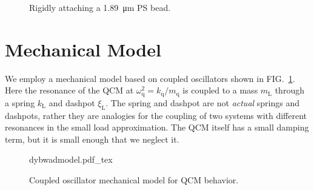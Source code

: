 \documentclass[floatfix,superscriptaddress,a4paper,notitlepage]{revtex4-1}
\newcommand{\Figure}[1]{FIG.~\ref{#1}}
\newcommand{\df}{\Delta\!f}
\newcommand{\dg}{\Delta\Gamma}
\newcommand{\xil}{\xi_\mathrm{L}}
\newcommand{\kl}{k_\mathrm{L}}
\newcommand{\ml}{m_\mathrm{L}}
\newcommand{\kq}{k_\mathrm{q}}
\newcommand{\mq}{m_\mathrm{q}}
\newcommand{\omegaq}{\omega_\mathrm{q}}
\begin{document}
\begin{figure}[h]
\centering
 \caption{Rigidly attaching a \SI{1.89}{\micro\meter} PS bead.}
\end{figure}

\section{Mechanical Model}
We employ a mechanical model based on coupled oscillators shown in
\Figure{fig:mechanicalmodel}.  Here the resonance of the QCM at
$\omegaq^2=\kq/\mq$ is coupled to a mass $\ml$ through a spring $\kl$ and
dashpot $\xil$.  The spring and dashpot are not \textit{actual} springs and
dashpots, rather they are analogies for the coupling of two systems with
different resonances in the small load approximation.  The QCM itself has a
small damping term, but it is small enough that we neglect it.
\begin{figure}[ht]
 \centering
 {dybwadmodel.pdf_tex}
 \caption{Coupled oscillator mechanical model for QCM behavior.}
 \label{fig:mechanicalmodel}
\end{figure}
\end{document}
